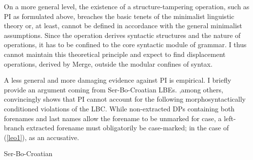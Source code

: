 \documentclass[output=paper]{langsci/langscibook}
\begin{document}
On a more general level, the existence of a stru\-cture-tampering operation,
such as \gls{PI} as formulated above, breaches the basic tenets of the
minimalist linguistic theory or, at least, cannot be defined in  accordance
with the general minimalist assumptions. Since the  operation derives
syntactic structures and the nature of  operations, it has to be
confined to the core syntactic module of grammar. I thus cannot maintain this
theoretical principle and expect to find displacement operations, derived by
Merge, outside the modular confines of syntax.

A less general and more damaging evidence against \gls{PI} is empirical. I
briefly provide an argument coming from Ser-Bo-Croatian
\glspl{LBE}. \citet{Boskovic:2009b},\linebreak among others, convincingly shows that
\gls{PI} cannot account for the following morphosyntactically conditioned
violations of the \gls{LBC}. While non-extracted DPs containing both forenames
and last names allow the forename to be unmarked for case, a left-branch
extracted forename must obligatorily be case-marked;
in the case of (\ref{leo1}), as an accusative.

\begin{exe}
\ex Ser-Bo-Croatian
\begin{xlista}
\ex
\begin{xlisti}


\end{xlisti}

\ex
\begin{xlisti}

\end{xlisti}

\end{xlista}
	\label{leo1}
\end{exe}
\end{document}
